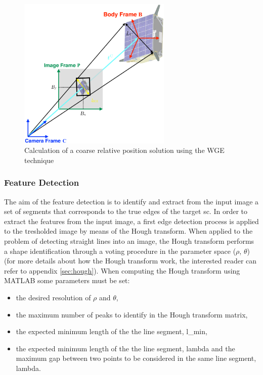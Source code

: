 \begin{figure}[htbp]
  \centering
  \includegraphics[width=0.65\textwidth]{gfx/coarsePoseEstimation.eps}
  \caption{Calculation of a coarse relative position solution using the WGE
    technique \cite{Sharma2018}}
  \label{fig:imageProcessingSubsystem}
\end{figure}

\subsubsection{Feature Detection}\label{sec:featureextraction}
The aim of the feature detection is to  identify and extract from the input image a set of segments that corresponds to the true edges of the target \acrshort{sc}.
In order to extract the features from the input image, a first edge detection process is applied to the tresholded image by means of the Hough transform. When applied to the problem of detecting straight lines into an image, the Hough transform performs a shape identification through a voting procedure in the parameter space ($\rho$, $\theta$) (for more details about how the Hough transform work, the interested reader can refer to appendix \ref{sec:hough}).
When computing the Hough transform using MATLAB some parameters must be set:

\begin{itemize}
  \item the desired resolution of $\rho$ and $\theta$,
  \item the maximum number of peaks to identify in the Hough transform matrix,
  \item the expected minimum length of the the line segment, \gls{l_min},
  \item the expected minimum length of the the line segment, \gls{lambda} and the maximum gap between two points to be considered in the same line segment, \gls{lambda}.
\end{itemize}

